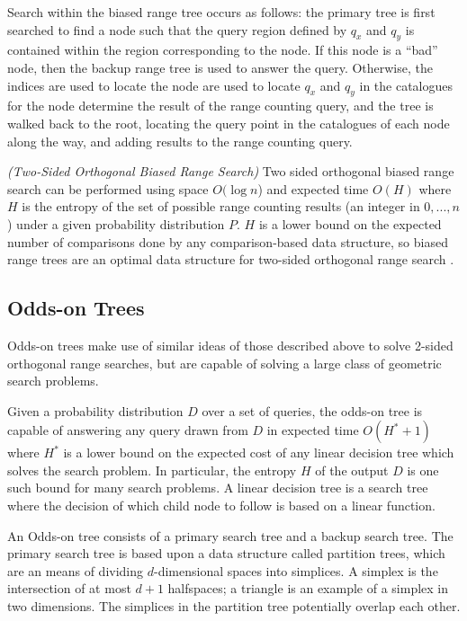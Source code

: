 \documentclass[mcs]{scsthesis}
\begin{document}
Search within the biased range tree occurs as follows: the primary tree is
first searched to find a node such that the query region defined by \(q_x\) and
\(q_y\) is contained within the region corresponding to the node. If this node
is a ``bad'' node, then the backup range tree is used to answer the query.
Otherwise, the indices are used to locate the node are used to locate \(q_x\)
and \(q_y\) in the catalogues for the node determine the result of the range
counting query, and the tree is walked back to the root, locating the query
point in the catalogues of each node along the way, and adding results to
the range counting query.

\begin{thm} \emph{(Two-Sided Orthogonal Biased Range Search)} 
Two sided orthogonal biased range search can be performed using space
\(O(\log n\)) and expected time \(O(H)\) where \(H\) is the entropy of the
set of possible range counting results (an integer in \({0, ..., n}\)) under
a given probability distribution \(P\). \(H\) is a lower bound on the expected
number of comparisons done by any comparison-based data structure, so
biased range trees are an optimal data structure for two-sided orthogonal
range search \cite{biasedrange}.
\end{thm}

\subsection{Odds-on Trees}

Odds-on trees make use of similar ideas of those described above to solve
2-sided orthogonal range searches, but are capable of solving a large class
of geometric search problems.

Given a probability distribution \(D\) over a set of queries, the odds-on tree
is capable of answering any query drawn from \(D\) in expected time
\(O(H^* + 1)\) where \(H^*\) is a lower bound on the expected cost of any
linear decision tree which solves the search problem. In particular, the
entropy \(H\) of the output \(D\) is one such bound for many search
problems. A linear decision tree is a search tree where the decision of which
child node to follow is based on a linear function.

An Odds-on tree consists of a primary search tree and a backup search tree.
The primary search tree is based upon a data structure called partition trees,
which are an means of dividing \(d\)-dimensional spaces into simplices. A
simplex is the intersection of at most \(d + 1\) halfspaces; a triangle is an
example of a simplex in two dimensions. The simplices in the partition tree
potentially overlap each other.
\end{document}
